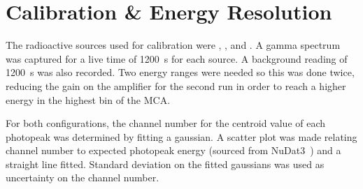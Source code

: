 \documentclass[11pt]{article}
\numberwithin{equation}{section}
\numberwithin{figure}{section}
\numberwithin{table}{section}
\begin{document}
\section{Calibration \& Energy Resolution}\label{sec:CalibrationResolution}
The radioactive sources used for calibration were , , and . A gamma spectrum was captured for a live time of \SI{1200}{\second} for each source. A background reading of \SI{1200}{\second} was also recorded. Two energy ranges were needed so this was done twice, reducing the gain on the amplifier for the second run in order to reach a higher energy in the highest bin of the MCA. 

For both configurations, the channel number for the centroid value of each photopeak was determined by fitting a gaussian. A scatter plot was made relating channel number to expected photopeak energy (sourced from NuDat3~\cite{nudat}) and a straight line fitted. Standard deviation on the fitted gaussians was used as uncertainty on the channel number. 
\end{document}

